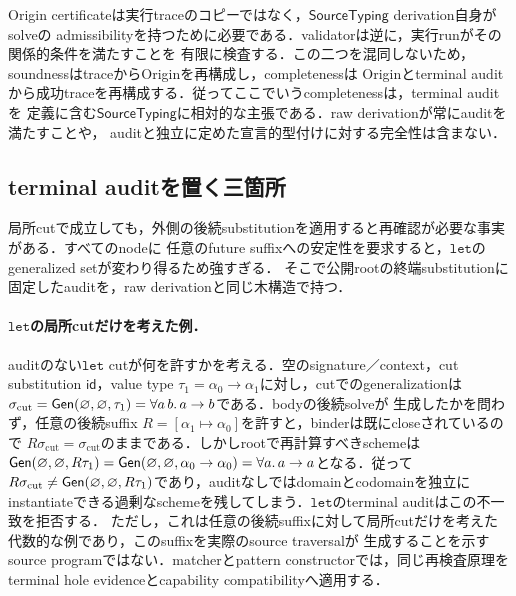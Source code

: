 Origin certificateは実行traceのコピーではなく，$\mathsf{SourceTyping}$ derivation自身がsolveの
admissibilityを持つために必要である．validatorは逆に，実行runがその関係的条件を満たすことを
有限に検査する．この二つを混同しないため，soundnessはtraceからOriginを再構成し，completenessは
Originとterminal auditから成功traceを再構成する．従ってここでいうcompletenessは，terminal auditを
定義に含む$\mathsf{SourceTyping}$に相対的な主張である．raw derivationが常にauditを満たすことや，
auditと独立に定めた宣言的型付けに対する完全性は含まない．

\subsection{terminal auditを置く三箇所}

局所cutで成立しても，外側の後続substitutionを適用すると再確認が必要な事実がある．すべてのnodeに
任意のfuture suffixへの安定性を要求すると，$\mathtt{let}$のgeneralized setが変わり得るため強すぎる．
そこで公開rootの終端substitutionに固定したauditを，raw derivationと同じ木構造で持つ．

\paragraph{$\mathtt{let}$の局所cutだけを考えた例．}
auditのない$\mathtt{let}$ cutが何を許すかを考える．空のsignature／context，cut substitution
$\mathsf{id}$，value type $\tau_1=\alpha_0\to\alpha_1$に対し，cutでのgeneralizationは
$\sigma_{\mathrm{cut}}=\mathsf{Gen}(\varnothing,\varnothing,\tau_1)=\forall a\,b.\,a\to b$である．bodyの後続solveが
生成したかを問わず，任意の後続suffix $R=[\alpha_1\mapsto\alpha_0]$を許すと，binderは既にcloseされているので
$R\sigma_{\mathrm{cut}}=\sigma_{\mathrm{cut}}$のままである．しかしrootで再計算すべきschemeは
$\mathsf{Gen}(\varnothing,\varnothing,R\tau_1)=\mathsf{Gen}(\varnothing,\varnothing,\alpha_0\to\alpha_0)=\forall a.\,a\to a$となる．従って
$R\sigma_{\mathrm{cut}}\ne\mathsf{Gen}(\varnothing,\varnothing,R\tau_1)$であり，auditなしではdomainとcodomainを独立に
instantiateできる過剰なschemeを残してしまう．$\mathtt{let}$のterminal auditはこの不一致を拒否する．
ただし，これは任意の後続suffixに対して局所cutだけを考えた代数的な例であり，このsuffixを実際のsource traversalが
生成することを示すsource programではない．matcherとpattern constructorでは，同じ再検査原理をterminal
hole evidenceとcapability compatibilityへ適用する．

